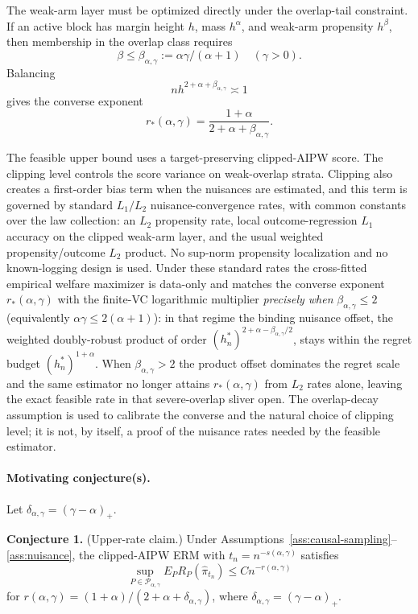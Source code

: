 \documentclass[11pt]{article}
\theoremstyle{definition}
\theoremstyle{plain}
\theoremstyle{remark}
\begin{document}
The weak-arm layer must be optimized directly under the overlap-tail
constraint.  If an active block has margin height \(h\), mass \(h^\alpha\),
and weak-arm propensity \(h^\beta\), then membership in the overlap class
requires
\[
\beta\le \beta_{\alpha,\gamma}:=\alpha\gamma/(\alpha+1)
\quad(\gamma>0).
\]
Balancing
\[
n h^{2+\alpha+\beta_{\alpha,\gamma}}\asymp1
\]
gives the converse exponent
\[
r_*(\alpha,\gamma)=
\frac{1+\alpha}{2+\alpha+\beta_{\alpha,\gamma}}.
\]

The feasible upper bound uses a target-preserving clipped-AIPW score.  The
clipping level controls the score variance on weak-overlap strata.  Clipping
also creates a first-order bias term when the nuisances are estimated, and
this term is governed by standard \(L_1/L_2\) nuisance-convergence rates, with
common constants over the law collection: an \(L_2\) propensity rate, local
outcome-regression \(L_1\) accuracy on the clipped weak-arm layer, and the
usual weighted propensity/outcome \(L_2\) product.  No sup-norm propensity
localization and no known-logging design is used.  Under these standard
rates the cross-fitted empirical welfare maximizer is data-only and matches
the converse exponent \(r_*(\alpha,\gamma)\) with the finite-VC logarithmic
multiplier \emph{precisely when} \(\beta_{\alpha,\gamma}\le2\) (equivalently
\(\alpha\gamma\le2(\alpha+1)\)): in that regime the binding nuisance offset,
the weighted doubly-robust product of order
\((h_n^*)^{2+\alpha-\beta_{\alpha,\gamma}/2}\), stays within the regret budget
\((h_n^*)^{1+\alpha}\).  When \(\beta_{\alpha,\gamma}>2\) the product offset
dominates the regret scale and the same estimator no longer attains
\(r_*(\alpha,\gamma)\) from \(L_2\) rates alone, leaving the exact feasible
rate in that severe-overlap sliver open.  The overlap-decay assumption is used
to calibrate the converse and the natural choice of clipping level; it is not,
by itself, a proof of the nuisance rates needed by the feasible estimator.

\paragraph{Motivating conjecture(s).}
Let \(\delta_{\alpha,\gamma}=(\gamma-\alpha)_+\).

\textbf{Conjecture 1.} (Upper-rate claim.) Under
Assumptions~\ref{ass:causal-sampling}--\ref{ass:nuisance}, the clipped-AIPW
ERM with \(t_n=n^{-s(\alpha,\gamma)}\) satisfies
\[
\sup_{P\in\mathcal{P}_{\alpha,\gamma}}
E_P R_P(\widehat\pi_{t_n})
\le C n^{-r(\alpha,\gamma)}
\]
for \(r(\alpha,\gamma)=(1+\alpha)/(2+\alpha+\delta_{\alpha,\gamma})\), where
\(\delta_{\alpha,\gamma}=(\gamma-\alpha)_+\).
\end{document}
